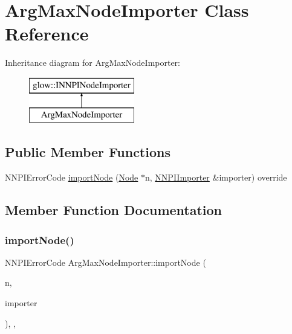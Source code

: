 \hypertarget{class_arg_max_node_importer}{}\section{Arg\+Max\+Node\+Importer Class Reference}
\label{class_arg_max_node_importer}
Inheritance diagram for Arg\+Max\+Node\+Importer\+:\begin{figure}[H]
\begin{center}
\leavevmode
\includegraphics[height=2.000000cm]{class_arg_max_node_importer}
\end{center}
\end{figure}
\subsection*{Public Member Functions}
\begin{DoxyCompactItemize}
\item 
N\+N\+P\+I\+Error\+Code \hyperlink{class_arg_max_node_importer_aa11667488bc00833ec726cd9bcc58ba0}{import\+Node} (\hyperlink{classglow_1_1_node}{Node} $\ast$n, \hyperlink{classglow_1_1_n_n_p_i_importer}{N\+N\+P\+I\+Importer} \&importer) override
\end{DoxyCompactItemize}


\subsection{Member Function Documentation}
\mbox{\label{class_arg_max_node_importer_aa11667488bc00833ec726cd9bcc58ba0}} 
\subsubsection{\texorpdfstring{import\+Node()}{importNode()}}
{\footnotesize\ttfamily N\+N\+P\+I\+Error\+Code Arg\+Max\+Node\+Importer\+::import\+Node (\begin{DoxyParamCaption}\item[{\hyperlink{classglow_1_1_node}{Node} $\ast$}]{n,  }\item[{\hyperlink{classglow_1_1_n_n_p_i_importer}{N\+N\+P\+I\+Importer} \&}]{importer }\end{DoxyParamCaption})\hspace{0.3cm}{\ttfamily [inline]}, {\ttfamily [override]}, {\ttfamily [virtual]}}


